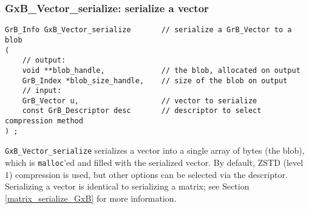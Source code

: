 \documentclass[12pt]{article}
\begin{document}
\subsubsection{{\sf GxB\_Vector\_serialize:}      serialize a vector}
\label{vector_serialize_GxB}

\begin{mdframed}[userdefinedwidth=6in]
{\footnotesize
\begin{verbatim}
GrB_Info GxB_Vector_serialize       // serialize a GrB_Vector to a blob
(
    // output:
    void **blob_handle,             // the blob, allocated on output
    GrB_Index *blob_size_handle,    // size of the blob on output
    // input:
    GrB_Vector u,                   // vector to serialize
    const GrB_Descriptor desc       // descriptor to select compression method
) ;
\end{verbatim}
} \end{mdframed}

\verb'GxB_Vector_serialize' serializes a vector into a single array of bytes
(the blob), which is \verb'malloc''ed and filled with the serialized vector.
By default, ZSTD (level 1) compression is used, but other options can be
selected via the descriptor.  Serializing a vector is identical to serializing
a matrix; see Section \ref{matrix_serialize_GxB} for more information.

\newpage

%
\end{document}
